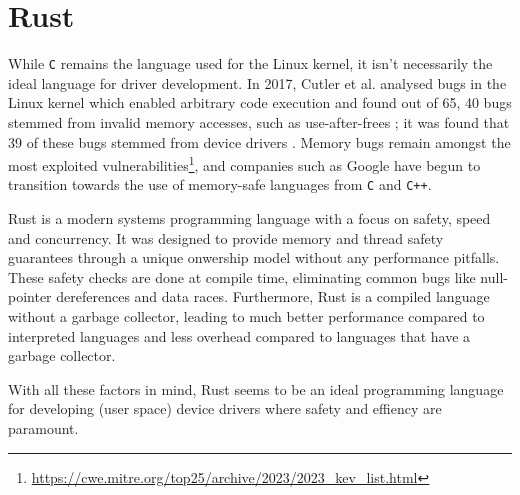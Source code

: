 \section{Rust}
While \texttt{C} remains the language used for the Linux kernel, it isn't necessarily the ideal language for driver development. In 2017, Cutler et al. analysed bugs in the Linux kernel which enabled arbitrary code execution and found out of 65, 40 bugs stemmed from invalid memory accesses, such as use-after-frees \cite{cutler}; it was found that 39 of these bugs stemmed from device drivers \cite{driver_lang}. Memory bugs remain amongst the most exploited vulnerabilities\footnote{\url{https://cwe.mitre.org/top25/archive/2023/2023_kev_list.html}}, and companies such as Google have begun to transition towards the use of memory-safe languages from \texttt{C} and \texttt{C++}.

Rust is a modern systems programming language with a focus on safety, speed and concurrency. It was designed to provide memory and thread safety guarantees through a unique onwership model without any performance pitfalls. These safety checks are done at compile time, eliminating common bugs like null-pointer dereferences and data races. Furthermore, Rust is a compiled language without a garbage collector, leading to much better performance compared to interpreted languages and less overhead compared to languages that have a garbage collector.

With all these factors in mind, Rust seems to be an ideal programming language for developing (user space) device drivers where safety and effiency are paramount.
